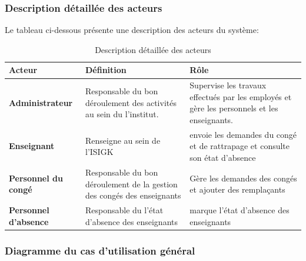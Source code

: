 \documentclass[12 pt]{report}
\begin{document}
\subsubsection{Description détaillée des acteurs}
Le tableau ci-dessous présente une description des acteurs du système:
\begin{table}[htbp]
\begin{center}
\caption{Description détaillée des acteurs \label{table-nom}}
\renewcommand{\arraystretch}{1.8}
\begin{tabular}{|p{5cm}|p{5cm}|p{6cm}|} 
 
\hline 
\cellcolor{PaleTurquoise}\textbf{Acteur} &\cellcolor{PaleTurquoise} \textbf{Définition} &\cellcolor{PaleTurquoise} \textbf{Rôle} \\
\hline
\textbf{Administrateur} & Responsable du bon
déroulement des activités au sein du l'institut.& Supervise les travaux effectués
par les employés et gère les personnels et les enseignants.

 \\
\hline
\textbf{Enseignant}&Renseigne au sein de l'ISIGK&envoie les demandes du congé et de rattrapage et consulte son état d'absence \\
\hline
\textbf{Personnel du congé}& Responsable du bon déroulement de la gestion des congés  des enseignants&  Gère les demandes des congés et ajouter des remplaçants \\
\hline
\textbf{Personnel d'absence}&Responsable du l'état d'absence des enseignants&marque l'état d'absence des enseignants \\
\hline
\end{tabular}
\end{center}
\end{table}
\newpage

\subsubsection{Diagramme du cas d’utilisation général}
\end{document}
